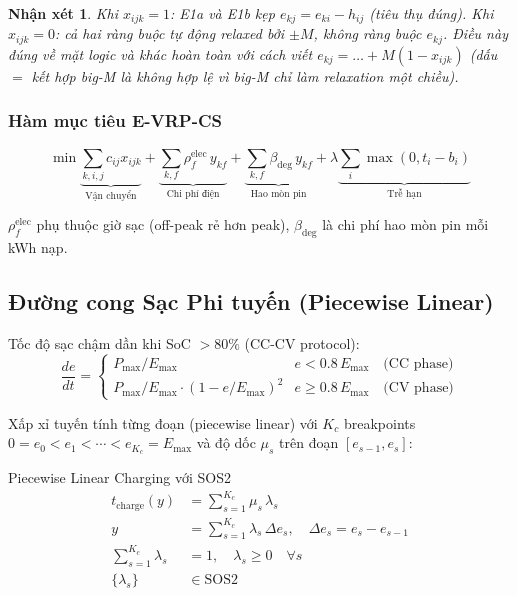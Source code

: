 \documentclass[12pt,a4paper]{article}
\newtheorem{remark}{Nhận xét}[section]
\begin{document}
\begin{remark}
Khi $x_{ijk}=1$: E1a và E1b kẹp $e_{kj}=e_{ki}-h_{ij}$ (tiêu thụ đúng).
Khi $x_{ijk}=0$: cả hai ràng buộc tự động relaxed bởi $\pm M$, không ràng buộc $e_{kj}$.
Điều này đúng về mặt logic và khác hoàn toàn với cách viết $e_{kj}=\ldots+M(1-x_{ijk})$
(dấu $=$ kết hợp big-M là không hợp lệ vì big-M chỉ làm relaxation một chiều).
\end{remark}

\subsubsection{Hàm mục tiêu E-VRP-CS}

\begin{equation}
  \min\underbrace{\sum_{k,i,j}c_{ij}x_{ijk}}_{\text{Vận chuyển}}
  + \underbrace{\sum_{k,f}\rho_f^{\mathrm{elec}}\,y_{kf}}_{\text{Chi phí điện}}
  + \underbrace{\sum_{k,f}\beta_{\mathrm{deg}}\,y_{kf}}_{\text{Hao mòn pin}}
  + \lambda\underbrace{\sum_i\max(0,t_i-b_i)}_{\text{Trễ hạn}}
\end{equation}

$\rho_f^{\mathrm{elec}}$ phụ thuộc giờ sạc (off-peak rẻ hơn peak),
$\beta_{\mathrm{deg}}$ là chi phí hao mòn pin mỗi kWh nạp.

\subsection{Đường cong Sạc Phi tuyến (Piecewise Linear)}

Tốc độ sạc chậm dần khi SoC $> 80\%$ (CC-CV protocol):
\begin{equation}
  \frac{de}{dt} =
  \begin{cases}
    P_{\max}/E_{\max} & e < 0.8\,E_{\max} \quad\text{(CC phase)}\\
    P_{\max}/E_{\max}\cdot(1 - e/E_{\max})^2 & e \geq 0.8\,E_{\max} \quad\text{(CV phase)}
  \end{cases}
\end{equation}

Xấp xỉ tuyến tính từng đoạn (piecewise linear) với $K_c$ breakpoints
$0=e_0<e_1<\cdots<e_{K_c}=E_{\max}$ và độ dốc $\mu_s$ trên đoạn $[e_{s-1},e_s]$:

\begin{formulabox}{Piecewise Linear Charging với SOS2}
\begin{align}
  t_{\mathrm{charge}}(y) &= \sum_{s=1}^{K_c}\mu_s\,\lambda_s \label{eq:pwl-time}\\
  y &= \sum_{s=1}^{K_c}\lambda_s\,\Delta e_s, \quad \Delta e_s = e_s - e_{s-1}\\
  \sum_{s=1}^{K_c}\lambda_s &= 1, \quad \lambda_s \geq 0 \quad\forall s
  \tag{Convex combination}\\
  \{\lambda_s\} &\in \mathrm{SOS2} \tag{SOS2: chỉ 2 biến liền kề $\neq 0$}
\end{align}
\end{formulabox}
\end{document}
